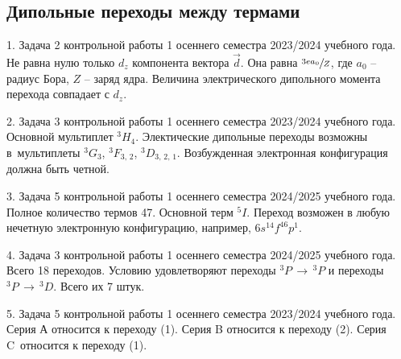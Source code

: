 \par
\newpage

\subsection{Дипольные переходы между термами}
1. Задача 2 контрольной работы 1 осеннего семестра 2023/2024 учебного года. Не равна нулю только $d_z$ компонента вектора $\vec d$. Она равна $\sfrac{3ea_0}{Z}$, где $a_0$ – радиус Бора, $Z$ – заряд ядра. Величина электрического дипольного момента перехода совпадает с $d_z$.\par
2. Задача 3 контрольной работы 1 осеннего семестра 2023/2024 учебного года. Основной мультиплет $^3H_4$. Электические дипольные переходы возможны в~мультиплеты $^3G_3$, $^3F_{3,\,2}$, $^3D_{3,\,2,\,1}$. Возбужденная электронная конфигурация должна быть четной.\par
3. Задача 5 контрольной работы 1 осеннего семестра 2024/2025 учебного года.  Полное количество термов 47. Основной терм $^5I$. Переход возможен в любую нечетную электронную конфигурацию, например, $6s^14f^46p^1$.\par
4. Задача 3 контрольной работы 1 осеннего семестра 2024/2025 учебного года. Всего 18 переходов. Условию удовлетворяют переходы $^3P\, \rightarrow\, ^3P$ и переходы $^3P\, \rightarrow\, ^3D$. Всего их 7 штук.\par
5. Задача 5 контрольной работы 1 осеннего семестра 2023/2024 учебного года. Серия А относится к переходу (1). Серия B относится к переходу (2). Серия C~относится к переходу (1).   \\
\newpage

